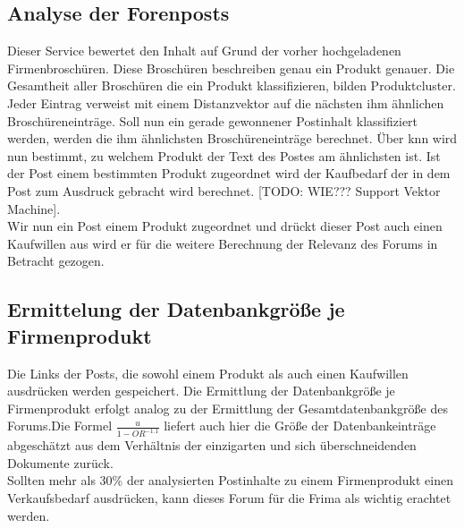 \subsection{Analyse der Forenposts}
Dieser Service bewertet den Inhalt auf Grund der vorher hochgeladenen Firmenbroschüren. Diese Broschüren beschreiben genau ein Produkt genauer. Die Gesamtheit aller Broschüren die ein Produkt klassifizieren, bilden Produktcluster. Jeder Eintrag verweist mit einem Distanzvektor auf die nächsten ihm ähnlichen Broschüreneinträge. Soll nun ein gerade gewonnener Postinhalt klassifiziert werden, werden die ihm ähnlichsten Broschüreneinträge berechnet. Über knn wird nun bestimmt, zu welchem Produkt der Text des Postes am ähnlichsten ist. Ist der Post einem bestimmten Produkt zugeordnet wird der Kaufbedarf der in dem Post zum Ausdruck gebracht wird berechnet. [TODO: WIE??? Support Vektor Machine].\\
Wir nun ein Post einem Produkt zugeordnet und drückt dieser Post auch einen Kaufwillen aus wird er für die weitere Berechnung der Relevanz des Forums in Betracht gezogen.
\subsection{Ermittelung der Datenbankgröße je Firmenprodukt}
Die Links der Posts, die sowohl einem Produkt als auch einen Kaufwillen ausdrücken werden gespeichert. Die Ermittlung der Datenbankgröße je Firmenprodukt erfolgt analog zu der Ermittlung der Gesamtdatenbankgröße des Forums.Die Formel \(\frac{u}{1-OR^{-1.1}}\) liefert auch hier die Größe der Datenbankeinträge abgeschätzt aus dem Verhältnis der einzigarten und sich überschneidenden Dokumente zurück.\\
Sollten mehr als 30\% der analysierten Postinhalte zu einem Firmenprodukt einen Verkaufsbedarf ausdrücken, kann dieses Forum für die Frima als wichtig erachtet werden.

